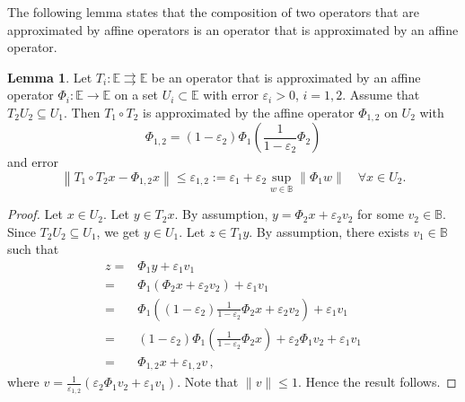 \documentclass[12pt]{article}
\theoremstyle{definition}
\newtheorem{lemma}{Lemma}
\begin{document}
The following lemma states that the composition of two operators that are approximated by affine operators is an operator that is approximated by an affine operator.
\begin{lemma}\label{lem:composition.affine.2}
Let $T_i:\mathbb E\rightrightarrows \mathbb E$ be an operator that is approximated by an affine operator $\Phi_i:\mathbb E\to \mathbb E$ on a set $U_i\subset \mathbb E$ with error $\varepsilon_i>0$,  $i=1,2$.
Assume that $T_2U_2\subseteq U_1$.
Then $T_1\circ T_2$ is approximated by the affine operator $\Phi_{1,2}$ on $U_2$ with
\begin{equation}
\Phi_{1,2}=(1-\varepsilon_2)\Phi_1(\frac{1}{1-\varepsilon_2}\Phi_2)
\end{equation}
and error
\begin{equation}
\left\|T_1\circ T_2x- \Phi_{1,2}x \right\|\leq
\varepsilon_{1,2}:=\varepsilon_1+\varepsilon_2 \sup_{w\in\mathbb B}{\|\Phi_1w\|}\quad \forall x\in U_2.
\end{equation}
\end{lemma}
\begin{proof}
Let $x\in U_2$.
Let $y\in T_2x$.
By assumption, $y=\Phi_2 x +\varepsilon_2 v_2$ for some $v_2\in\mathbb B$.
Since $T_2U_2\subseteq U_1$, we get $y\in U_1$.
Let $z\in T_1y$.
By assumption, there exists $v_1\in \mathbb B$ such that
\begin{equation}
\begin{array}{rl}
z=&\Phi_1 y+\varepsilon_1 v_1\\
=&\Phi_1 (\Phi_2 x +\varepsilon_2 v_2)+\varepsilon_1 v_1\\
=&\Phi_1 ((1-\varepsilon_2)\frac{1}{1-\varepsilon_2}\Phi_2 x +\varepsilon_2 v_2)+\varepsilon_1 v_1\\
=&(1-\varepsilon_2)\Phi_1 (\frac{1}{1-\varepsilon_2}\Phi_2 x) +\varepsilon_2 \Phi_1v_2+\varepsilon_1 v_1\\
=&\Phi_{1,2} x +\varepsilon_{1,2} v\,,
\end{array}
\end{equation}
where $v=\frac{1}{\varepsilon_{1,2}}(\varepsilon_2 \Phi_1v_2+\varepsilon_1 v_1)$.
Note that $\|v\|\le 1$.
Hence the result follows.
\end{proof}
\end{document}
